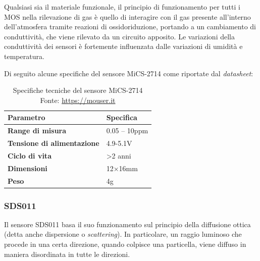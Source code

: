Qualsiasi sia il materiale funzionale, il principio di funzionamento per tutti i MOS nella rilevazione di gas è quello di interagire con il gas presente all’interno dell’atmosfera tramite reazioni di ossidoriduzione, portando a un cambiamento di conduttività, che viene rilevato da un circuito apposito. Le variazioni della conduttività dei sensori è fortemente influenzata dalle variazioni di umidità e temperatura. \cite{relazione_alice}

Di seguito alcune specifiche del sensore MiCS-2714 come riportate dal \textit{datasheet}:

\begin{table}[H]
    \footnotesize
    \centering
    \begin{tabular}{|l|l|}
    \hline
        \textbf{Parametro} & \textbf{Specifica} \\ \hline
        \textbf{Range di misura} & 0.05 – 10ppm \\ \hline
        \textbf{Tensione di alimentazione} & 4.9-5.1V \\ \hline
        \textbf{Ciclo di vita} & >2 anni \\ \hline
        \textbf{Dimensioni} & 12×16mm \\ \hline
        \textbf{Peso} & 4g \\ \hline
    \end{tabular}
    \captionsetup{justification=centering}
    \caption{Specifiche tecniche del sensore MiCS-2714\\Fonte: \url{https://mouser.it}}
    \label{fig:mics-specifiche}
\end{table}

\subsubsection{SDS011}\label{sensore-pm}
Il sensore SDS011 basa il suo funzionamento sul principio della diffusione ottica (detta anche dispersione o \textit{scattering}). In particolare, un raggio luminoso che procede in una certa direzione, quando colpisce una particella, viene diffuso in maniera disordinata in tutte le direzioni. \cite{sds}

